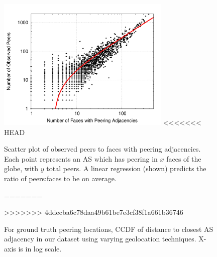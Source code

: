
    \begin{figure}[tb]
\centering
\includegraphics[width=3.25in]{scatter}
<<<<<<< HEAD
\caption[]{\label{fig:scatter} Scatter plot of observed peers to faces with peering adjacencies. Each point represents an AS which has peering in $x$ faces of the globe, with $y$ total peers. A linear regression (shown) predicts the ratio of peers:faces to be  on average. } 
=======
\caption[]{For ground truth peering locations, CCDF of distance to closest AS
adjacency in our dataset using varying geolocation techniques. X-axis is in log
scale.} 
>>>>>>> 4ddecba6c78daa49b61be7e3cf38f1a661b36746
\end{figure}

